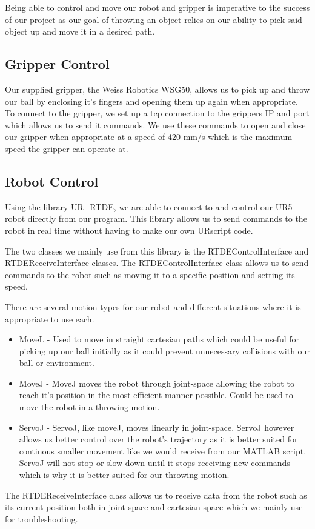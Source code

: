  \label{sec:RobotControl}

Being able to control and move our robot and gripper is imperative to the success of our project as our goal of throwing an object relies on our ability to pick said object up and move it in a desired path.
\subsection{Gripper Control}
Our supplied gripper, the Weiss Robotics WSG50, allows us to pick up and throw our ball by enclosing it's fingers and opening them up again when appropriate.
To connect to the gripper, we set up a tcp connection to the grippers IP and port which allows us to send it commands.
We use these commands to open and close our gripper when appropriate at a speed of 420 mm/s which is the maximum speed the gripper can operate at.

\subsection{Robot Control}
Using the library UR\_RTDE, we are able to connect to and control our UR5 robot directly from our program.
This library allows us to send commands to the robot in real time without having to make our own URscript code.

The two classes we mainly use from this library is the RTDEControlInterface and RTDEReceiveInterface classes.
The RTDEControlInterface class allows us to send commands to the robot such as moving it to a specific position and setting its speed.

There are several motion types for our robot and different situations where it is appropriate to use each.
\begin{itemize}
    \item MoveL
    \linebreak- Used to move in straight cartesian paths which could be useful for picking up our ball initially as it could prevent unnecessary collisions with our ball or environment.
    \item MoveJ
    \linebreak- MoveJ moves the robot through joint-space allowing the robot to reach it's position in the most efficient manner possible. Could be used to move the robot in a throwing motion.
    \item ServoJ
    \linebreak- ServoJ, like moveJ, moves linearly in joint-space. ServoJ however allows us better control over the robot's trajectory as it is better suited for continous smaller movement like we would receive from our MATLAB script. ServoJ will not stop or slow down until it stops receiving new commands which is why it is better suited for our throwing motion.
\end{itemize}
The RTDEReceiveInterface class allows us to receive data from the robot such as its current position both in joint space and cartesian space which we mainly use for troubleshooting.


